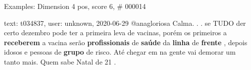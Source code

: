\begin{frame}{Examples: Dimension 4 pos, score 6, \# 000014}
\footnotesize
\begin{exampleblock}{text: t034837, user: unknown, 2020-06-29}
@anagloriosa Calma. . . se TUDO der certo dezembro pode ter a primeira leva de 
vacinas, porém os primeiros a \textbf{receberem} a vacina serão 
\textbf{profissionais} de \textbf{saúde} da \textbf{linha} de \textbf{frente} , 
depois idosos e pessoas de \textbf{grupo} de risco. Até chegar em na gente vai 
demorar um tanto mais. Quem sabe Natal de 21 . 
\end{exampleblock}
\end{frame}
